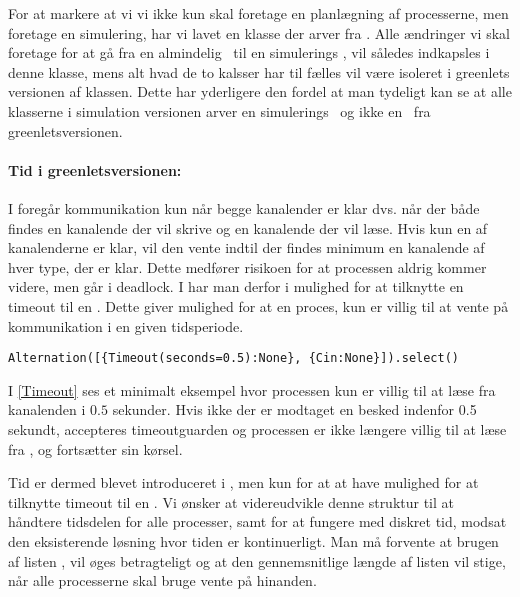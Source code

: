 
For at markere at vi vi ikke kun skal foretage en planlægning
af processerne, men foretage en simulering, har vi lavet en
 klasse der arver fra . Alle ændringer
vi skal foretage for at gå fra en almindelig \sched ~til en simulerings
\sched, vil således indkapsles i denne klasse, mens alt hvad de to
kalsser har til fælles vil være isoleret i greenlets versionen af
\sched klassen. Dette har yderligere den fordel at man tydeligt kan se
at alle klasserne i simulation versionen arver en simulerings \sched ~og
ikke en \sched ~fra greenletsversionen.


\paragraph*{Tid i greenletsversionen:} I \pycsp foregår kommunikation
kun når begge kanalender er klar dvs. når der både findes en
kanalende der vil skrive og en kanalende der vil læse. Hvis
kun en af kanalenderne er klar, vil den vente indtil der findes
minimum en kanalende af hver type, der er klar. Dette medfører
risikoen for at processen aldrig kommer videre, men går i deadlock.
I \pycsp har man derfor i  mulighed for at
tilknytte en timeout til en . Dette giver mulighed for
at en proces, kun er villig til at vente på kommunikation i en
given tidsperiode. \begin{lstlisting}[float=hbtp, label=Timeout,
caption=Timeout i Alternation (fra dokumentationen til PyCSP)]
Alternation([{Timeout(seconds=0.5):None}, {Cin:None}]).select()
\end{lstlisting}

I \cref{Timeout} ses et minimalt eksempel hvor processen kun er villig
til at læse fra kanalenden  i $0.5$ sekunder. Hvis ikke der
er modtaget en besked indenfor 0.5 sekundt, accepteres timeoutguarden
og processen er ikke længere villig til at læse fra , og
fortsætter sin kørsel.

Tid er dermed blevet introduceret i \pycsp, men kun for at at have
mulighed for at tilknytte timeout til en . Vi ønsker
at videreudvikle denne struktur til at håndtere tidsdelen for alle
processer, samt for at fungere med diskret tid, modsat den eksisterende
løsning hvor tiden er kontinuerligt. Man må forvente at brugen af
listen , vil øges betragteligt og at den gennemsnitlige
længde af listen vil stige, når alle processerne skal bruge vente på
hinanden.

